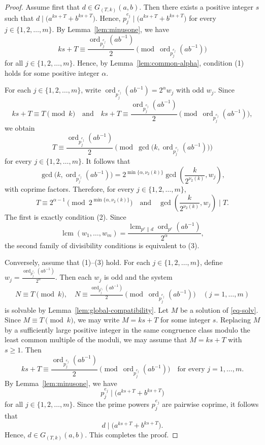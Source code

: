 \documentclass[pdflatex,sn-mathphys-num]{sn-jnl}%
\theoremstyle{thmstyleone}%
\theoremstyle{thmstyletwo}%
\theoremstyle{thmstylethree}%
\newcommand{\ord}{\operatorname{ord}}
\newcommand{\lcm}{\operatorname{lcm}}
\begin{document}
\begin{proof}
Assume first that $
d\in G_{(T,k)}(a,b)$.
Then there exists a positive integer $s$ such that $
d\mid \bigl(a^{ks+T}+b^{ks+T}\bigr)$.
Hence, 
$
p_j^{e_j}\mid \bigl(a^{ks+T}+b^{ks+T}\bigr)$ 
for every $j\in \{1,2,\dots,m\}$.
By Lemma~\ref{lem:minusone}, we have 
\[
ks+T\equiv \frac{\ord_{p_j^{e_j}}(ab^{-1})}{2}
\pmod{\ord_{p_j^{e_j}}(ab^{-1})}
\] for all   $j\in \{1,2,\dots,m\}$.
Hence, by Lemma~\ref{lem:common-alpha}, condition \textup{(1)} holds for some positive integer $\alpha$.

For each  $j\in \{1,2,\dots,m\}$, write
$
\ord_{p_j^{e_j}}(ab^{-1})=2^\alpha w_j$ with odd  $w_j$. Since
\[
ks+T\equiv T\pmod{k}
\quad\text{and}\quad
ks+T\equiv \frac{\ord_{p_j^{e_j}}(ab^{-1})}{2}
\pmod{\ord_{p_j^{e_j}}(ab^{-1})},
\]
we obtain
\[
T\equiv \frac{\ord_{p_j^{e_j}}(ab^{-1})}{2}
\pmod{\gcd\bigl(k,\ord_{p_j^{e_j}}(ab^{-1})\bigr)} 
\]
for every $j\in \{1,2,\dots,m\}$. 
It follows that 
\[
\gcd\bigl(k,\ord_{p_j^{e_j}}(ab^{-1})\bigr)
=
2^{\min\{\alpha,\nu_2(k)\}}
\gcd\left(\frac{k}{2^{\nu_2(k)}},w_j\right),
\]
with coprime factors. Therefore, for every $j\in \{1,2,\dots,m\}$,
\[
T\equiv 2^{\alpha-1}\pmod{2^{\min\{\alpha,\nu_2(k)\}}}
\quad \text{and} \quad
\gcd\left(\frac{k}{2^{\nu_2(k)}},w_j\right)\mid T.
\]
The first is exactly condition \textup{(2)}. Since
\[
\lcm(w_1,\dots,w_m)
=
\frac{\lcm_{p^e\parallel d}\ord_{p^e}(ab^{-1})}{2^\alpha},
\]
the second family of divisibility conditions is equivalent to \textup{(3)}.

Conversely, assume that \textup{(1)}--\textup{(3)} hold. For each $j\in \{1,2,\dots,m\}$, define
$
w_j=\frac{\ord_{p_j^{e_j}}(ab^{-1})}{2^\alpha}$.
Then each $w_j$ is odd  and  the system
\begin{align} \label{eq-solv}
N\equiv T\pmod{k},
\quad
N\equiv \frac{\ord_{p_j^{e_j}}(ab^{-1})}{2}
\pmod{\ord_{p_j^{e_j}}(ab^{-1})}
\quad (j=1,\dots,m)
\end{align}
is solvable by Lemma~\ref{lem:global-compatibility}. Let $M$ be a solution of \eqref{eq-solv}. Since $M\equiv T\pmod{k}$, we may write
$
M=ks+T$ 
for some integer $s$.  Replacing $M$ by a sufficiently large positive integer in the same congruence class modulo the least common multiple of the moduli, we may assume that
$
M=ks+T$
with $s\ge 1$. Then
\[
ks+T\equiv \frac{\ord_{p_j^{e_j}}(ab^{-1})}{2}
\pmod{\ord_{p_j^{e_j}}(ab^{-1})}
\quad\text{for every } j=1,\dots,m.
\]
By Lemma~\ref{lem:minusone}, we have 
\[
p_j^{e_j}\mid \bigl(a^{ks+T}+b^{ks+T}\bigr)
\] for all  $j\in \{1,2,\dots,m\}$. 
Since the prime powers $p_j^{e_j}$ are pairwise coprime, it follows that
\[
d\mid \bigl(a^{ks+T}+b^{ks+T}\bigr).
\]
Hence,  
$
d\in G_{(T,k)}(a,b)$. 
This completes the proof.
\end{proof}
\end{document}
